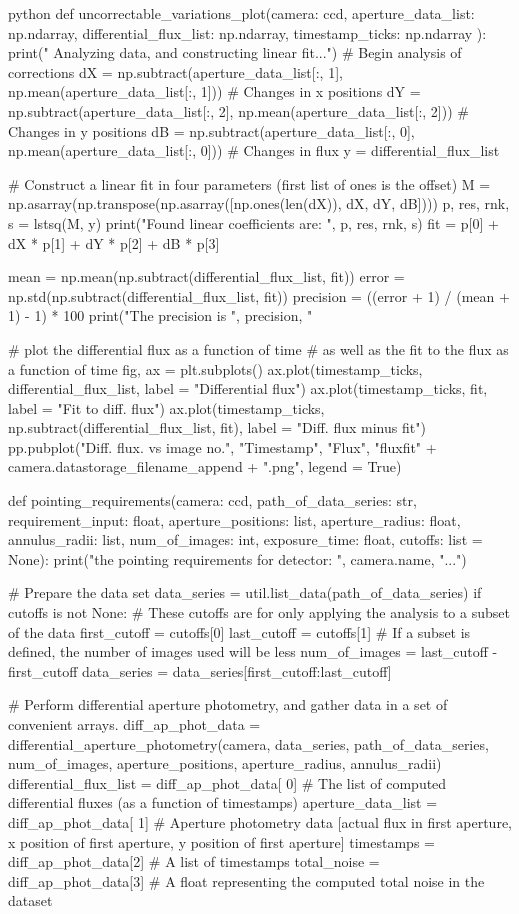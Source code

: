 \documentclass[../main.tex]{subfiles}
\begin{document}
\begin{mintedbox}{python}
def uncorrectable_variations_plot(camera: ccd,
aperture_data_list: np.ndarray,
differential_flux_list: np.ndarray,
timestamp_ticks: np.ndarray
):
print(" Analyzing data, and constructing linear fit...")
# Begin analysis of corrections
dX  =  np.subtract(aperture_data_list[:, 1], np.mean(aperture_data_list[:, 1]))  # Changes in x positions
dY  =  np.subtract(aperture_data_list[:, 2], np.mean(aperture_data_list[:, 2]))  # Changes in y positions
dB  =  np.subtract(aperture_data_list[:, 0], np.mean(aperture_data_list[:, 0]))  # Changes in flux
y  =  differential_flux_list

# Construct a linear fit in four parameters (first list of ones is the offset)
M  =  np.asarray(np.transpose(np.asarray([np.ones(len(dX)), dX, dY, dB])))
p, res, rnk, s  =  lstsq(M, y)
print("Found linear coefficients are: ", p, res, rnk, s)
fit  =  p[0] + dX * p[1] + dY * p[2] + dB * p[3]

mean  =  np.mean(np.subtract(differential_flux_list, fit))
error  =  np.std(np.subtract(differential_flux_list, fit))
precision  =  ((error + 1) / (mean + 1) - 1) * 100
print("The precision is ", precision, "%

# plot the differential flux as a function of time
# as well as the fit to the flux as a function of time
fig, ax  =  plt.subplots()
ax.plot(timestamp_ticks, differential_flux_list, label  =  "Differential flux")
ax.plot(timestamp_ticks, fit, label  =  "Fit to diff. flux")
ax.plot(timestamp_ticks, np.subtract(differential_flux_list, fit), label  =  "Diff. flux minus fit")
pp.pubplot("Diff. flux. vs image no.", "Timestamp", "Flux", "fluxfit" + camera.datastorage_filename_append + ".png",
legend  =  True)


def pointing_requirements(camera: ccd, path_of_data_series: str, requirement_input: float, aperture_positions: list,
aperture_radius: float, annulus_radii: list, num_of_images: int, exposure_time: float,
cutoffs: list  =  None):
print("\nAnalyzing the pointing requirements for detector: ", camera.name, "...")

# Prepare the data set
data_series  =  util.list_data(path_of_data_series)
if cutoffs is not None:
# These cutoffs are for only applying the analysis to a subset of the data
first_cutoff  =  cutoffs[0]
last_cutoff  =  cutoffs[1]
# If a subset is defined, the number of images used will be less
num_of_images  =  last_cutoff - first_cutoff
data_series  =  data_series[first_cutoff:last_cutoff]

# Perform differential aperture photometry, and gather data in a set of convenient arrays.
diff_ap_phot_data  =  differential_aperture_photometry(camera, data_series, path_of_data_series, num_of_images,
aperture_positions, aperture_radius, annulus_radii)
differential_flux_list  =  diff_ap_phot_data[
0]  # The list of computed differential fluxes (as a function of timestamps)
aperture_data_list  =  diff_ap_phot_data[
1]  # Aperture photometry data [actual flux in first aperture, x position of first aperture, y position of first aperture]
timestamps  =  diff_ap_phot_data[2]  # A list of timestamps
total_noise  =  diff_ap_phot_data[3]  # A float representing the computed total noise in the dataset


\end{mintedbox}
\end{document}
